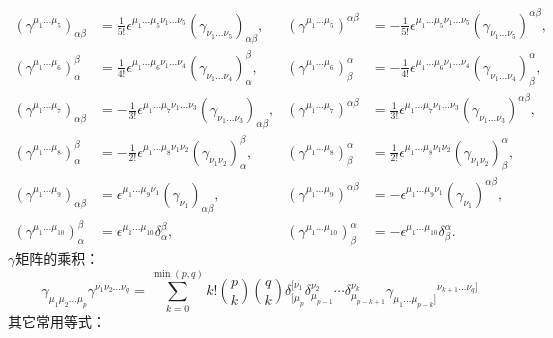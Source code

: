 \begin{equation}
	\begin{aligned}
		(\gamma^{\mu_1...\mu_5})_{\alpha\beta} 
		&= \frac{1}{5!} \epsilon^{\mu_1...\mu_5\nu_1...\nu_5} (\gamma_{\nu_1...\nu_5})_{\alpha\beta}, 
		& (\gamma^{\mu_1...\mu_5})^{\alpha\beta} 
		&= -\frac{1}{5!} \epsilon^{\mu_1...\mu_5\nu_1...\nu_5} (\gamma_{\nu_1...\nu_5})^{\alpha\beta}, \\
		(\gamma^{\mu_1...\mu_6})_{\alpha}^{\beta} 
		&= \frac{1}{4!} \epsilon^{\mu_1...\mu_6\nu_1...\nu_4} (\gamma_{\nu_1...\nu_4})_{\alpha}^{\beta}, 
		& (\gamma^{\mu_1...\mu_6})^{\alpha}_{\beta} 
		&= -\frac{1}{4!} \epsilon^{\mu_1...\mu_6\nu_1...\nu_4} (\gamma_{\nu_1...\nu_4})^{\alpha}_{\beta}, \\
		(\gamma^{\mu_1...\mu_7})_{\alpha\beta} 
		&= -\frac{1}{3!} \epsilon^{\mu_1...\mu_7\nu_1...\nu_3} (\gamma_{\nu_1...\nu_3})_{\alpha\beta}, 
		& (\gamma^{\mu_1...\mu_7})^{\alpha\beta} 
		&= \frac{1}{3!} \epsilon^{\mu_1...\mu_7\nu_1...\nu_3} (\gamma_{\nu_1...\nu_3})^{\alpha\beta}, \\
		(\gamma^{\mu_1...\mu_8})_{\alpha}^{\beta} 
		&= -\frac{1}{2!} \epsilon^{\mu_1...\mu_8\nu_1\nu_2} (\gamma_{\nu_1\nu_2})_{\alpha}^{\beta}, 
		& (\gamma^{\mu_1...\mu_8})^{\alpha}_{\beta} 
		&= \frac{1}{2!} \epsilon^{\mu_1...\mu_8\nu_1\nu_2} (\gamma_{\nu_1\nu_2})^{\alpha}_{\beta}, \\
		(\gamma^{\mu_1...\mu_9})_{\alpha\beta} 
		&= \epsilon^{\mu_1...\mu_9\nu_1} (\gamma_{\nu_1})_{\alpha\beta}, 
		& (\gamma^{\mu_1...\mu_9})^{\alpha\beta} 
		&= -\epsilon^{\mu_1...\mu_9\nu_1} (\gamma_{\nu_1})^{\alpha\beta}, \\
		(\gamma^{\mu_1...\mu_{10}})_{\alpha}^{\beta} 
		&= \epsilon^{\mu_1...\mu_{10}} \delta_{\alpha}^{\beta}, 
		& (\gamma^{\mu_1...\mu_{10}})^{\alpha}_{\beta} 
		&= -\epsilon^{\mu_1...\mu_{10}} \delta_{\beta}^{\alpha}.
	\end{aligned}
\end{equation}
$\gamma$矩阵的乘积：
\begin{equation}
	\gamma_{\mu_1\mu_2\ldots\mu_p} \gamma^{\nu_1\nu_2\ldots\nu_q} = \sum_{k=0}^{\min(p,q)} k! \binom{p}{k} \binom{q}{k} \delta_{[\mu_p}^{[\nu_1} \delta_{\mu_{p-1}}^{\nu_2} \cdots \delta_{\mu_{p-k+1}}^{\nu_k} {\gamma_{\mu_1\ldots\mu_{p-k}]}}^{\nu_{k+1}\ldots\nu_q]}
\end{equation}
其它常用等式：
